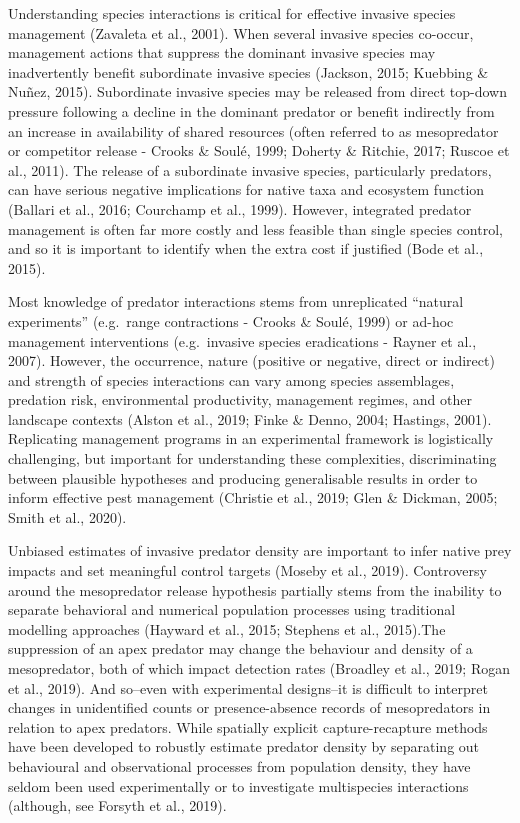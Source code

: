 \documentclass[]{elsarticle} %
\begin{document}
Understanding species interactions is critical for effective invasive species management (Zavaleta et al., 2001). When several invasive species co-occur, management actions that suppress the dominant invasive species may inadvertently benefit subordinate invasive species (Jackson, 2015; Kuebbing \& Nuñez, 2015). Subordinate invasive species may be released from direct top-down pressure following a decline in the dominant predator or benefit indirectly from an increase in availability of shared resources (often referred to as mesopredator or competitor release - Crooks \& Soulé, 1999; Doherty \& Ritchie, 2017; Ruscoe et al., 2011). The release of a subordinate invasive species, particularly predators, can have serious negative implications for native taxa and ecosystem function (Ballari et al., 2016; Courchamp et al., 1999). However, integrated predator management is often far more costly and less feasible than single species control, and so it is important to identify when the extra cost if justified (Bode et al., 2015).

Most knowledge of predator interactions stems from unreplicated ``natural experiments'' (e.g.~range contractions - Crooks \& Soulé, 1999) or ad-hoc management interventions (e.g.~invasive species eradications - Rayner et al., 2007). However, the occurrence, nature (positive or negative, direct or indirect) and strength of species interactions can vary among species assemblages, predation risk, environmental productivity, management regimes, and other landscape contexts (Alston et al., 2019; Finke \& Denno, 2004; Hastings, 2001). Replicating management programs in an experimental framework is logistically challenging, but important for understanding these complexities, discriminating between plausible hypotheses and producing generalisable results in order to inform effective pest management (Christie et al., 2019; Glen \& Dickman, 2005; Smith et al., 2020).

Unbiased estimates of invasive predator density are important to infer native prey impacts and set meaningful control targets (Moseby et al., 2019). Controversy around the mesopredator release hypothesis partially stems from the inability to separate behavioral and numerical population processes using traditional modelling approaches (Hayward et al., 2015; Stephens et al., 2015).The suppression of an apex predator may change the behaviour and density of a mesopredator, both of which impact detection rates (Broadley et al., 2019; Rogan et al., 2019). And so--even with experimental designs--it is difficult to interpret changes in unidentified counts or presence-absence records of mesopredators in relation to apex predators. While spatially explicit capture-recapture methods have been developed to robustly estimate predator density by separating out behavioural and observational processes from population density, they have seldom been used experimentally or to investigate multispecies interactions (although, see Forsyth et al., 2019).
\end{document}
